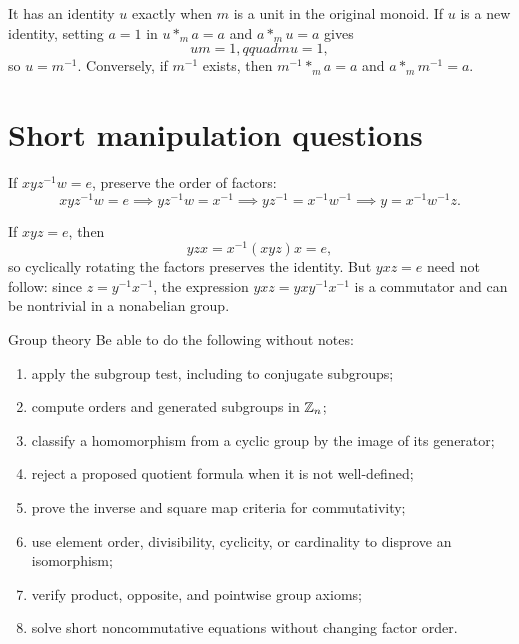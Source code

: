 \documentclass[11pt,openany]{book}
\theoremstyle{definition}
\begin{document}
It has an identity $u$ exactly when $m$ is a unit in the original monoid. If $u$ is a new identity, setting $a=1$ in $u*_m a=a$ and $a*_m u=a$ gives
\[
um=1,qquad mu=1,
\]
so $u=m^{-1}$. Conversely, if $m^{-1}$ exists, then
$m^{-1}*_m a=a$ and $a*_m m^{-1}=a$.

\section{Short manipulation questions}
If $xyz^{-1}w=e$, preserve the order of factors:
\[
xyz^{-1}w=e
\implies yz^{-1}w=x^{-1}
\implies yz^{-1}=x^{-1}w^{-1}
\implies \boxed{y=x^{-1}w^{-1}z}.
\]

If $xyz=e$, then
\[
yzx=x^{-1}(xyz)x=e,
\]
so cyclically rotating the factors preserves the identity. But $yxz=e$ need not follow: since $z=y^{-1}x^{-1}$, the expression $yxz=yxy^{-1}x^{-1}$ is a commutator and can be nontrivial in a nonabelian group.

\begin{checkpoint}{Group theory}
Be able to do the following without notes:
\begin{enumerate}
\item apply the subgroup test, including to conjugate subgroups;
\item compute orders and generated subgroups in $\mathbb Z_n$;
\item classify a homomorphism from a cyclic group by the image of its generator;
\item reject a proposed quotient formula when it is not well-defined;
\item prove the inverse and square map criteria for commutativity;
\item use element order, divisibility, cyclicity, or cardinality to disprove an isomorphism;
\item verify product, opposite, and pointwise group axioms;
\item solve short noncommutative equations without changing factor order.
\end{enumerate}
\end{checkpoint}
\end{document}
